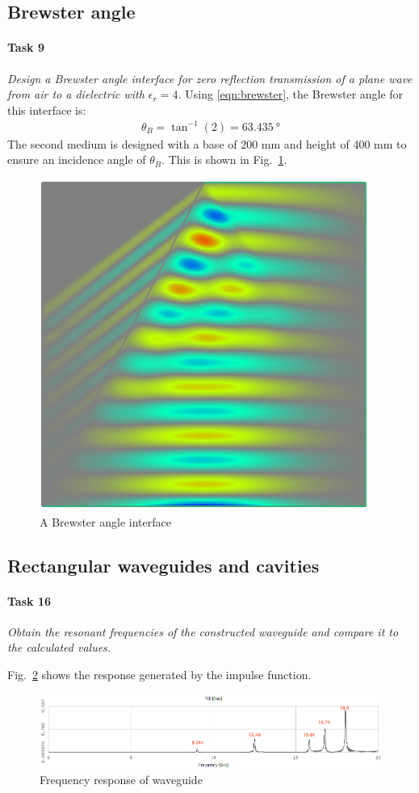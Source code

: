 \subsection{Brewster angle}
\paragraph{Task 9}\textit{Design a Brewster angle interface for zero reflection transmission of a plane wave from air to a dielectric with $\epsilon_r = 4$.}
Using \eqref{eqn:brewster}, the Brewster angle for this interface is:
\begin{align*}
	\theta_B = \tan^{-1}(2) = \SI{63.435}{\degree} 
\end{align*}
The second medium is designed with a base of 200 mm and height of 400 mm to ensure an incidence angle of $\theta_B$.
This is shown in Fig.~\ref{fig:Task9-Brewster}.

\begin{figure}[tbph]
	\centering
	\includegraphics[width=0.6\linewidth]{graphics/Task9-Brewster}
	\caption{A Brewster angle interface}
	\label{fig:Task9-Brewster}
\end{figure}


\subsection{Rectangular waveguides and cavities}
\paragraph{Task 16}\textit{Obtain the resonant frequencies of the constructed waveguide and compare it to the calculated values.}

Fig.~\ref{fig:Task16-Analyzer} shows the response generated by the impulse function.
\begin{figure}[tbph]
	\centering
	\includegraphics[width=0.95\linewidth]{graphics/Task16-Analyzer-annotated}
	\caption{Frequency response of waveguide}
	\label{fig:Task16-Analyzer}
\end{figure}

